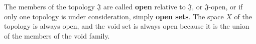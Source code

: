 The members of the topology $\mathfrak{J}$ are called \textbf{open} relative to $\mathfrak{J}$, or $\mathfrak{J}$-open, or if only one topology is under consideration, simply \textbf{open sets}. The space $X$ of the topology is always open, and the void set is always open because it is the union of the members of the void family.
